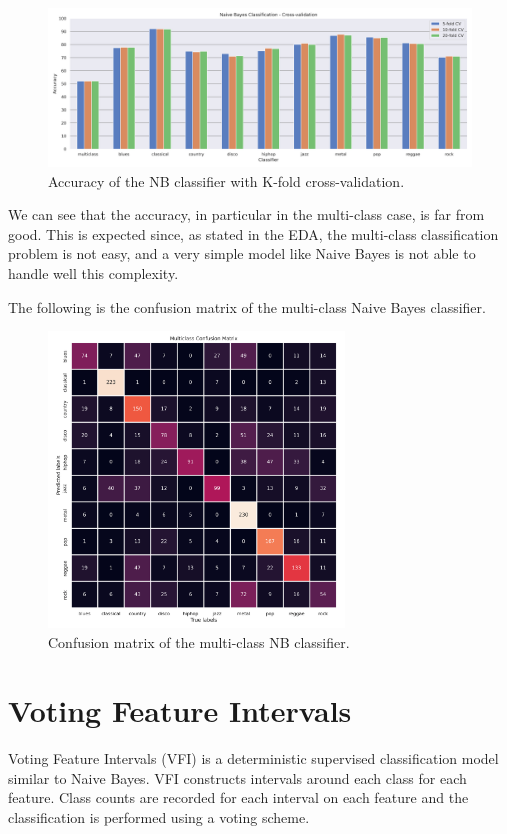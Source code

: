 \documentclass{Configuration_Files/PoliMi3i_thesis}
\begin{document}
\begin{figure}[H]
    \centering
    \includegraphics[width=\textwidth]{Figures/nb_d.png}
    \caption{Accuracy of the NB classifier with K-fold cross-validation.}
    \label{fig:nbd}
\end{figure}

We can see that the accuracy, in particular in the multi-class case, is far from good. 
This is expected since, as stated in the EDA, the multi-class classification problem is not easy, and a very simple model like Naive Bayes is not able to handle well this complexity.

The following is the confusion matrix of the multi-class Naive Bayes classifier.

\begin{figure}[H]
    \centering
    \includegraphics[width=0.7\textwidth]{Figures/nb_m.png}
    \caption{Confusion matrix of the multi-class NB classifier.}
    \label{fig:nbc}
\end{figure}

\pagebreak


\section{Voting Feature Intervals}
\label{sec:vfi}%
Voting Feature Intervals (VFI) is a deterministic supervised classification model similar to Naive Bayes. VFI constructs intervals around each class for each feature. Class counts are recorded for each interval on each feature and the classification is performed using a voting scheme.
\end{document}
